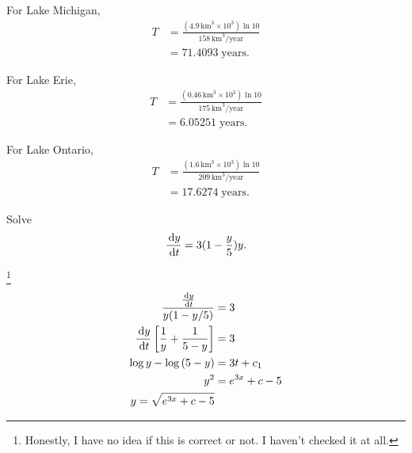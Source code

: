 \begin{ex}
\begin{enumerate}
\begin{sol}
          For Lake Michigan,
          \begin{align*}
            T&=\frac{\left(4.9\, \text{km}^3 \times 10^3\right) \ln{10}}{158\, \text{km}^3/\text{year}} \\
            &=71.4093\; \text{years}.
          \end{align*}

          For Lake Erie,
          \begin{align*}
            T&=\frac{\left(0.46 \, \text{km}^3 \times 10^3\right) \ln{10}}{175\, \text{km}^3/\text{year}} \\
            &=6.05251\; \text{years}.
          \end{align*}

          For Lake Ontario,
          \begin{align*}
            T&=\frac{\left(1.6\, \text{km}^3 \times 10^3\right) \ln{10}}{209\, \text{km}^3/\text{year}} \\
            &=17.6274\; \text{years}.
          \end{align*}
        \end{sol}
    \end{enumerate}
\end{ex}
\begin{ex}
  Solve \[\frac{\,\mathrm{d} y}{\,\mathrm{d} t}=3(1-\frac{y}{5})y. \]
  \begin{sol}\footnote{Honestly, I have no idea if this is correct or not. I haven't checked it at all.}
    \begin{align*}
      \frac{\frac{\,\mathrm{d} y}{\,\mathrm{d} t}}{y(1-y/5)}&=3 \\
      \frac{\,\mathrm{d} y}{\,\mathrm{d} t}\left[\frac{1}{y}+\frac{1}{5-y}\right]&=3 \\
      \log y - \log{(5-y)}&=3t+c_1 \\
      y^2&=e^{3x}+c-5 \\
      y= \sqrt{e^{3x}+c-5}
    \end{align*}
  \end{sol}
\end{ex}
